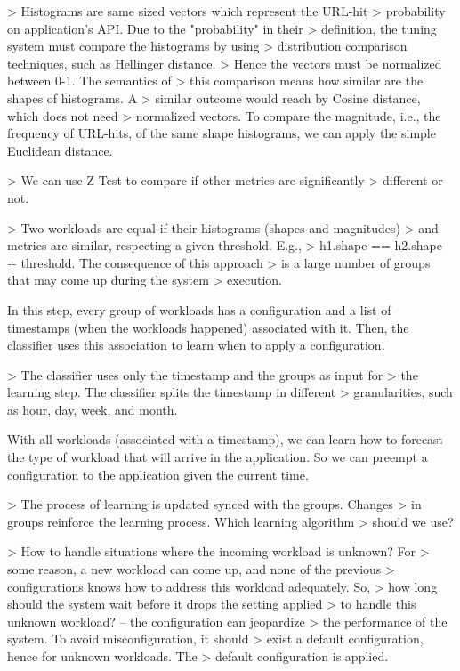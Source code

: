 > Histograms are same sized vectors which represent the URL-hit
> probability on application's API. Due to the "probability" in their
> definition, the tuning system must compare the histograms by using
> distribution comparison techniques, such as Hellinger distance.
> Hence the vectors must be normalized between 0-1. The semantics of
> this comparison means how similar are the shapes of histograms. A
> similar outcome would reach by Cosine distance, which does not need
> normalized vectors.
To compare the magnitude, i.e., the frequency of URL-hits, of the same
shape histograms, we can apply the simple Euclidean distance.

> We can use Z-Test to compare if other metrics are significantly
> different or not.

> Two workloads are equal if their histograms (shapes and magnitudes)
> and metrics are similar, respecting a given threshold. E.g.,
> h1.shape == h2.shape + threshold. The consequence of this approach
> is a large number of groups that may come up during the system
> execution.

In this step, every group of workloads has a configuration and a list
of timestamps (when the workloads happened) associated with it. Then,
the classifier uses this association to learn when to apply a
configuration.

> The classifier uses only the timestamp and the groups as input for
> the learning step. The classifier splits the timestamp in different
> granularities, such as hour, day, week, and month.

With all workloads (associated with a timestamp), we can learn how to
forecast the type of workload that will arrive in the application. So
we can preempt a configuration to the application given the current
time.

> The process of learning is updated synced with the groups. Changes
> in groups reinforce the learning process. Which learning algorithm
> should we use?

> How to handle situations where the incoming workload is unknown? For
> some reason, a new workload can come up, and none of the previous
> configurations knows how to address this workload adequately. So,
> how long should the system wait before it drops the setting applied
> to handle this unknown workload? -- the configuration can jeopardize
> the performance of the system. To avoid misconfiguration, it should
> exist a default configuration, hence for unknown workloads. The
> default configuration is applied.

